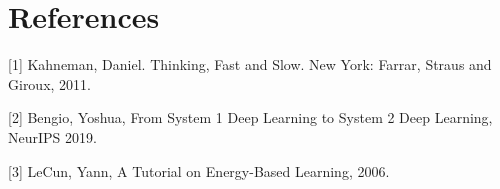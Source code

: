 \documentclass{article}
\begin{document}





% 

\section*{References}

\small

[1] Kahneman, Daniel. Thinking, Fast and Slow. New York: Farrar, Straus and Giroux, 2011. 

[2] Bengio, Yoshua, From System 1 Deep Learning to System 2 Deep Learning, NeurIPS 2019.

[3] LeCun, Yann, A Tutorial on Energy-Based Learning, 2006.


\end{document}
